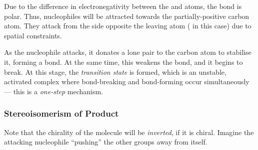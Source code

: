 

			Due to the difference in electronegativity between the  and  atoms, the  bond is polar. Thus,
			nucleophiles will be attracted towards the partially-positive carbon atom. They attack from the side opposite the
			leaving atom ( in this case) due to spatial constraints.

			As the nucleophile attacks, it donates a lone pair to the carbon atom to stabilise it, forming a bond. At the same time, this
			weakens the  bond, and it begins to break. At this stage, the \textit{transition state} is formed, which is an
			unstable, activated complex where bond-breaking and bond-forming occur simultaneously --- this is a \textit{one-step} mechanism.

			\subsubsection{Stereoisomerism of Product}

				Note that the chirality of the molecule will be \textit{inverted}, if it is chiral. Imagine the attacking nucleophile
				\enquote{pushing} the other groups away from itself.

